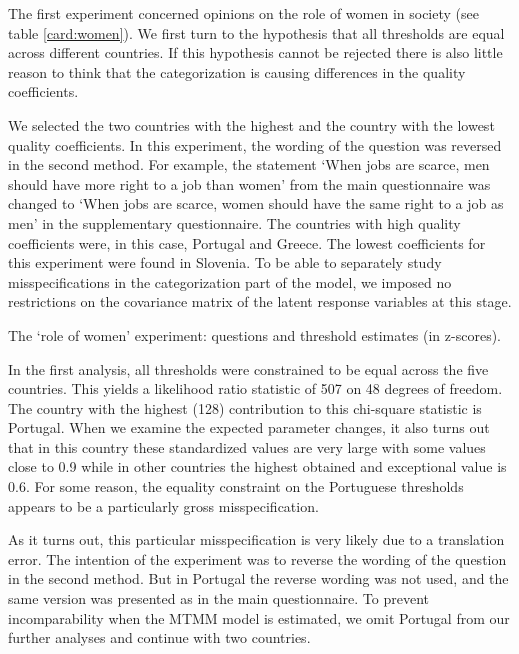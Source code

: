 \documentclass[a4paper,12pt]{article}
\begin{document}
The first experiment concerned opinions on the role of women in society (see table \ref{card:women}). We first turn to the hypothesis that all thresholds are equal across different countries. If this hypothesis cannot be rejected  there is also little reason to think that the categorization is causing differences in the quality coefficients. 

We selected the two countries with the highest and the country with the lowest quality coefficients. In this experiment, the wording of the question was reversed in the second method. For example, the statement `When jobs are scarce, men should have more right to a job than women' from the main questionnaire was changed to `When jobs are scarce, women should have the same right to a job as men' in the supplementary questionnaire. The countries with high quality coefficients were, in this case, Portugal and Greece. The lowest coefficients for this experiment were found in Slovenia. To be able to separately study misspecifications in the categorization part of the model, we imposed no restrictions on the covariance matrix of the latent response variables at this stage. 

\begin{table}[bht]\caption{\label{card:women}The `role of women' experiment: questions and threshold estimates (in z-scores).}\fbox{\begin{minipage}{\textwidth}\begin{small}
	
\end{small}\end{minipage}}\end{table}

In the first analysis, all thresholds were constrained to be equal across the five countries. This yields a likelihood ratio statistic of 507 on 48 degrees of freedom. The country with the highest (128) contribution to this chi-square statistic is Portugal. When we examine the expected parameter changes, it also turns out that in this country these standardized values are very large with some values close to 0.9 while in other countries the highest obtained and exceptional value is 0.6. For some reason, the equality constraint on the Portuguese thresholds appears to be a particularly gross misspecification.

As it turns out, this particular misspecification is very likely due to a translation error. The intention of the experiment was to reverse the wording of the question in the second method. But in Portugal the reverse wording was not used, and the same version was presented as in the main questionnaire.  To prevent incomparability when the MTMM model is estimated, we omit Portugal from our further analyses and continue with two countries. 
\end{document}
